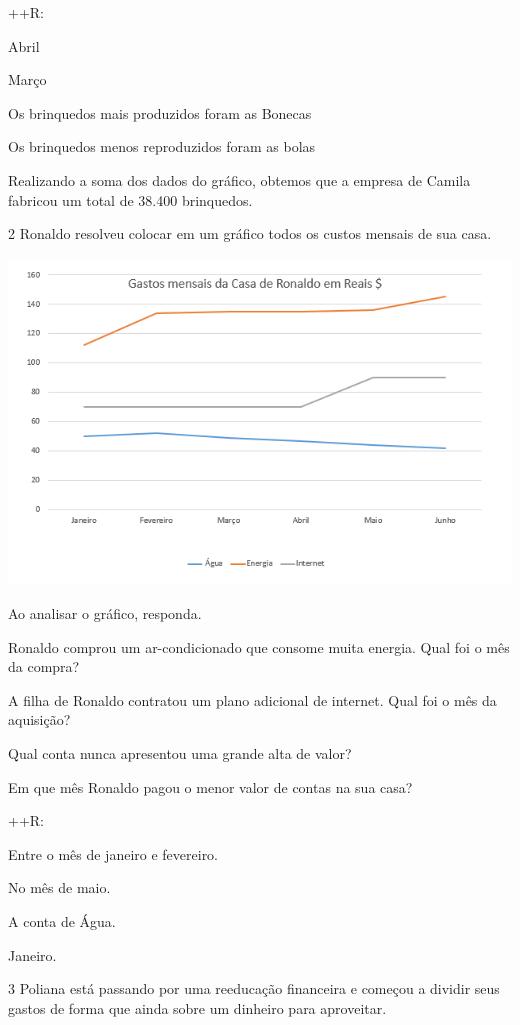 {++R:
\item Abril
\item Março
\item Os brinquedos mais produzidos foram as Bonecas
\item Os brinquedos menos reproduzidos foram as bolas
\item Realizando a soma dos dados do gráfico, obtemos que a empresa de
Camila fabricou um total de 38.400 brinquedos.

\num{2} Ronaldo resolveu colocar em um gráfico todos os custos mensais de sua
casa.

\includegraphics[width=5.30833in,height=3.41384in]{./imgSAEB_8_MAT/media/image40.png}

Ao analisar o gráfico, responda.
\item Ronaldo comprou um ar-condicionado que consome muita energia. Qual
foi o mês da compra?
\item A filha de Ronaldo contratou um plano adicional de internet. Qual foi
o mês da aquisição?
\item Qual conta nunca apresentou uma grande alta de valor?
\item Em que mês Ronaldo pagou o menor valor de contas na sua casa?

++R:
\item Entre o mês de janeiro e fevereiro.
\item No mês de maio.
\item A conta de Água.
\item Janeiro.

\num{3} Poliana está passando por uma reeducação financeira e começou a
dividir seus gastos de forma que ainda sobre um dinheiro para
aproveitar.

}
